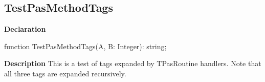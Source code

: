 \documentclass{report}
\begin{document}
\subsection*{TestPasMethodTags}
\begin{list}{}{
\setlength{\itemindent}{0cm}
\setlength{\listparindent}{0cm}
\setlength{\leftmargin}{\evensidemargin}
\addtolength{\leftmargin}{\tmplength}
\settowidth{\labelsep}{X}
\addtolength{\leftmargin}{\labelsep}
\setlength{\labelwidth}{\tmplength}
}
\begin{flushleft}
\item[\textbf{Declaration}\hfill]
\begin{ttfamily}
function TestPasMethodTags(A, B: Integer): string;\end{ttfamily}


\end{flushleft}
\par
\item[\textbf{Description}]
This is a test of tags expanded by TPasRoutine handlers. Note that all three tags are expanded recursively.

 




\end{list}
\end{document}
